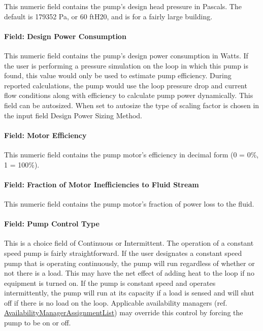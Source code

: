 This numeric field contains the pump's design head pressure in Pascals. The default is 179352 Pa, or 60 ftH20, and is for a fairly large building.

\paragraph{Field: Design Power Consumption}\label{field-design-power-consumption-1}

This numeric field contains the pump's design power consumption in Watts. If the user is performing a pressure simulation on the loop in which this pump is found, this value would only be used to estimate pump efficiency. During reported calculations, the pump would use the loop pressure drop and current flow conditions along with efficiency to calculate pump power dynamically. This field can be autosized. When set to autosize the type of scaling factor is chosen in the input field Design Power Sizing Method.

\paragraph{Field: Motor Efficiency}\label{field-motor-efficiency-1-000}

This numeric field contains the pump motor's efficiency in decimal form (0 = 0\%, 1 = 100\%).

\paragraph{Field: Fraction of Motor Inefficiencies to Fluid Stream}\label{field-fraction-of-motor-inefficiencies-to-fluid-stream-1}

This numeric field contains the pump motor's fraction of power loss to the fluid.

\paragraph{Field: Pump Control Type}\label{field-pump-control-type-1-000}

This is a choice field of Continuous or Intermittent. The operation of a constant speed pump is fairly straightforward. If the user designates a constant speed pump that is operating continuously, the pump will run regardless of whether or not there is a load. This may have the net effect of adding heat to the loop if no equipment is turned on. If the pump is constant speed and operates intermittently, the pump will run at its capacity if a load is sensed and will shut off if there is no load on the loop. Applicable availability managers (ref. \hyperref[availabilitymanagerassignmentlist]{AvailabilityManagerAssignmentList}) may override this control by forcing the pump to be on or off.

